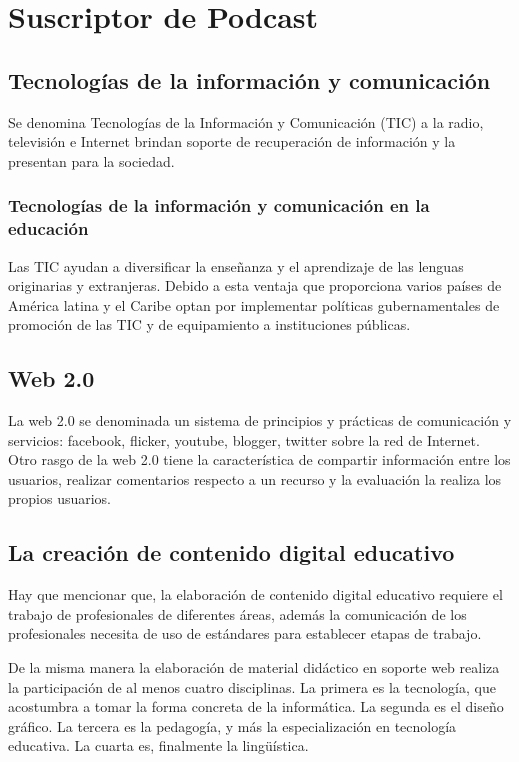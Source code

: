 \chapter{Suscriptor de Podcast}

\section{Tecnologías de la información y comunicación}

Se denomina Tecnologías de la Información y Comunicación (TIC) a la radio,
televisión e Internet brindan soporte de recuperación de información
y la presentan para la sociedad.

\subsection{Tecnologías de la información y comunicación en la educación}

Las TIC ayudan a diversificar la enseñanza y el aprendizaje de las lenguas
originarias y extranjeras. Debido a esta ventaja que proporciona varios
países de América latina y el Caribe optan por implementar políticas
gubernamentales de promoción de las TIC y de equipamiento a instituciones
públicas.

\section{Web 2.0}

La web 2.0 se denominada un sistema de principios y prácticas de comunicación y
servicios: facebook, flicker, youtube, blogger, twitter sobre la red de Internet.
Otro rasgo de la web 2.0 tiene la característica de compartir información entre
los usuarios, realizar comentarios respecto a un recurso y la evaluación la
realiza los propios usuarios. 

\section{La creación de contenido digital educativo}

Hay que mencionar que, la elaboración de contenido digital educativo requiere el
trabajo de profesionales de diferentes áreas, además la comunicación de los
profesionales necesita de uso de estándares para establecer etapas de trabajo.

De la misma manera la elaboración de material didáctico en soporte web
realiza la participación de al menos cuatro disciplinas. La primera es la
tecnología, que acostumbra a tomar la forma concreta de la informática. La
segunda es el diseño gráfico. La tercera es la pedagogía, y más la
especialización en tecnología educativa. La cuarta es, finalmente la lingüística.
\cite{duart2000aprender}


